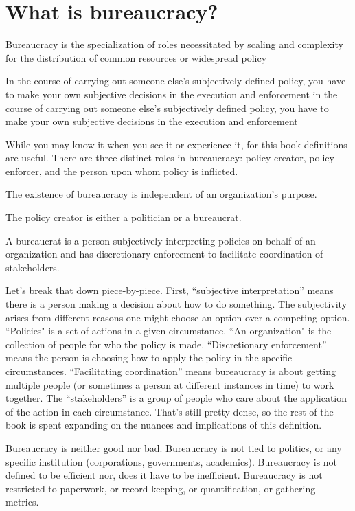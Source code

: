 \section{What is bureaucracy?\label{sec:define_bureaucracy}}

Bureaucracy is the specialization of roles necessitated by scaling and complexity for the distribution of common resources or widespread policy

In the course of carrying out someone else's subjectively defined policy, you have to make your own subjective decisions in the execution and enforcement in the course of carrying out someone else's subjectively defined policy, you have to make your own subjective decisions in the execution and enforcement


While you may know it when you see it or experience it, for this book definitions are useful. There are three distinct roles in bureaucracy: policy creator, policy enforcer, and the person upon whom policy is inflicted.

The existence of bureaucracy is independent of an organization's purpose.


The policy creator is either a politician or a bureaucrat. 

A \gls{bureaucrat} is a person subjectively interpreting policies on behalf of an organization and has discretionary enforcement to facilitate coordination of stakeholders. 

Let's break that down piece-by-piece. First, ``subjective interpretation'' means there is a person making a decision about how to do something. The subjectivity arises from different reasons one might choose an option over a competing option.  ``Policies" is a set of actions in a given circumstance. ``An \gls{organization}" is the collection of people for who the policy is made. ``Discretionary enforcement'' means the person is choosing how to apply the policy in the specific circumstances. ``Facilitating coordination'' means bureaucracy is about getting multiple people (or sometimes a person at different instances in time) to work together. The ``stakeholders'' is a group of people who care about the application of the action in each circumstance.  That's still pretty dense, so the rest of the book is spent expanding on the nuances and implications of this definition.

Bureaucracy is neither good nor bad. Bureaucracy is not tied to politics, or any specific institution (corporations, governments, academics). Bureaucracy is not defined to be efficient nor, does it have to be inefficient. Bureaucracy is not restricted to paperwork, or record keeping, or quantification, or gathering metrics. 

